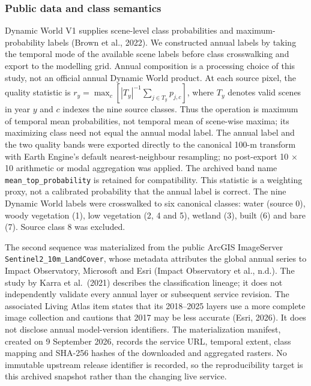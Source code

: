 \subsubsection{Public data and class
semantics}\label{public-data-and-class-semantics}

Dynamic World V1 supplies scene-level class probabilities and
maximum-probability labels (Brown et al., 2022). We constructed annual
labels by taking the temporal mode of the available scene labels before
class crosswalking and export to the modelling grid. Annual composition
is a processing choice of this study, not an official annual Dynamic
World product. At each source pixel, the quality statistic is
\(r_y=\max_c[|T_y|^{-1}\sum_{j\in T_y}p_{j,c}]\), where \(T_y\) denotes
valid scenes in year \(y\) and \(c\) indexes the nine source classes.
Thus the operation is maximum of temporal mean probabilities, not
temporal mean of scene-wise maxima; its maximizing class need not equal
the annual modal label. The annual label and the two quality bands were
exported directly to the canonical 100-m transform with Earth Engine's
default nearest-neighbour resampling; no post-export 10 × 10 arithmetic
or modal aggregation was applied. The archived band name
\texttt{mean\_top\_probability} is retained for compatibility. This
statistic is a weighting proxy, not a calibrated probability that the
annual label is correct. The nine Dynamic World labels were crosswalked
to six canonical classes: water (source 0), woody vegetation (1), low
vegetation (2, 4 and 5), wetland (3), built (6) and bare (7). Source
class 8 was excluded.

The second sequence was materialized from the public ArcGIS ImageServer
\texttt{Sentinel2\_10m\_LandCover}, whose metadata attributes the global
annual series to Impact Observatory, Microsoft and Esri (Impact
Observatory et al., n.d.). The study by Karra et al.~(2021) describes
the classification lineage; it does not independently validate every
annual layer or subsequent service revision. The associated Living Atlas
item states that its 2018--2025 layers use a more complete image
collection and cautions that 2017 may be less accurate (Esri, 2026). It
does not disclose annual model-version identifiers. The materialization
manifest, created on 9 September 2026, records the service URL, temporal
extent, class mapping and SHA-256 hashes of the downloaded and
aggregated rasters. No immutable upstream release identifier is
recorded, so the reproducibility target is this archived snapshot rather
than the changing live service.


